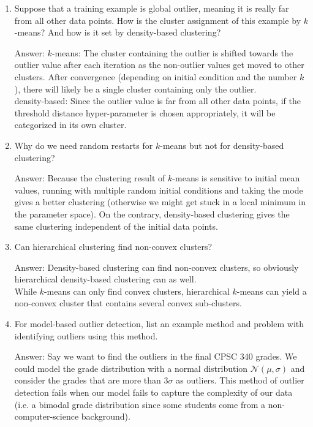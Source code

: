 \documentclass{article}
\newenvironment{answer}{\par\begingroup\color{gre}Answer: }{\endgroup}
\begin{document}
\begin{enumerate}
\item Suppose that a training example is global outlier, meaning it is really far from all other data points. How is the cluster assignment of this example by $k$-means? And how is it set by density-based clustering?
\begin{answer}
    $k$-means: The cluster containing the outlier is shifted towards the outlier value after each iteration as the non-outlier values get moved to other clusters. After convergence (depending on initial condition and the number $k$), there will likely be a single cluster containing only the outlier.\\
    density-based: Since the outlier value is far from all other data points, if the threshold distance hyper-parameter is chosen appropriately, it will be categorized in its own cluster.
\end{answer}

\item Why do we need random restarts for $k$-means but not for density-based clustering?
\begin{answer}
    Because the clustering result of $k$-means is sensitive to initial mean values,
    running with multiple random initial conditions and taking the mode gives a better clustering (otherwise we might get stuck in a local minimum in the parameter space). On the contrary, density-based clustering gives the same clustering independent of the initial data points.
\end{answer}

\item Can hierarchical clustering find non-convex clusters?
\begin{answer}
    Density-based clustering can find non-convex clusters, so obviously hierarchical density-based clustering can as well.\\
    While $k$-means can only find convex clusters, hierarchical $k$-means can yield a non-convex cluster that contains several convex sub-clusters.
\end{answer}

\item For model-based outlier detection, list an example method and problem with identifying outliers using this method.
\begin{answer}
    Say we want to find the outliers in the final CPSC 340 grades. We could model the grade distribution with a normal distribution $\mathcal{N}(\mu, \sigma)$ and consider the grades that are more than $3\sigma$ as outliers. This method of outlier detection fails when our model fails to capture the complexity of our data (i.e. a bimodal grade distribution since some students come from a non-computer-science background).
\end{answer}


\end{enumerate}
\end{document}
